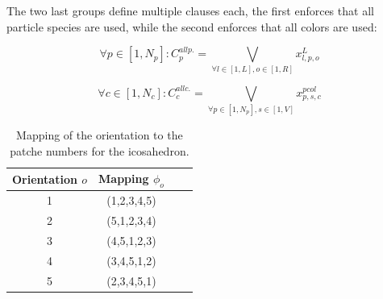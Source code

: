 \documentclass[a4paper, amsfonts, amssymb, amsmath, reprint, showkeys, nofootinbib, oneside]{revtex4-1}
\begin{document}
The two last groups define multiple clauses each, the first enforces that all particle species are used, while the second enforces that all colors are used:

\begin{equation}
\forall p\in [1, N_p]:C_p^{all p.}= \underset{\forall l \in [1,L], o\in [1,R]}{\bigvee} x_{l,p,o}^L
\end{equation}

\begin{equation}
\forall c\in [1, N_c]:C_c^{all c.}= \underset{\forall p \in [1,N_p], s\in [1,V]}{\bigvee} x_{p,s,c}^{pcol}
\end{equation}

\begin{table}[h!]
	\begin{center}
		\begin{tabular}{ cccc } 
			\hline
			Orientation $o$ & Mapping $\phi_o$ \\
			\hline
			1 & (1,2,3,4,5) \\ 
			2 & (5,1,2,3,4) \\ 
			3 & (4,5,1,2,3) \\ 
			4 & (3,4,5,1,2) \\
			5 & (2,3,4,5,1) \\
			\hline
		\end{tabular}
		\caption{Mapping of the orientation to the patche numbers for the icosahedron.}
	\end{center}
\end{table}
\end{document}
